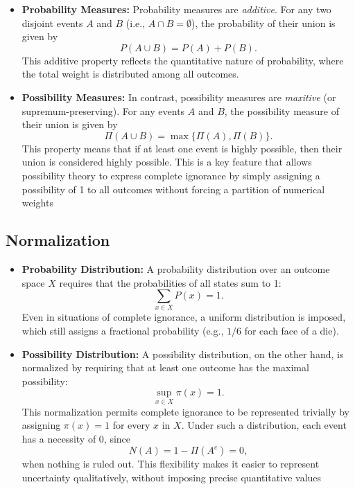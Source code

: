 \documentclass[14pt,a4paper]{report}
\begin{document}
\begin{itemize}
  \item \textbf{Probability Measures:}  
  Probability measures are \emph{additive}. For any two disjoint events \(A\) and \(B\) (i.e., \(A\cap B=\emptyset\)), the probability of their union is given by
  \[
  P(A \cup B) = P(A) + P(B).
  \]
  This additive property reflects the quantitative nature of probability, where the total weight is distributed among all outcomes.

  \item \textbf{Possibility Measures:}  
  In contrast, possibility measures are \emph{maxitive} (or supremum-preserving). For any events \(A\) and \(B\), the possibility measure of their union is given by
  \[
  \Pi(A \cup B) = \max\{\Pi(A), \Pi(B)\}.
  \]
  This property means that if at least one event is highly possible, then their union is considered highly possible. This is a key feature that allows possibility theory to express complete ignorance by simply assigning a possibility of 1 to all outcomes without forcing a partition of numerical weights 
\end{itemize}

\subsection{Normalization}

\begin{itemize}
  \item \textbf{Probability Distribution:}  
  A probability distribution over an outcome space \(X\) requires that the probabilities of all states sum to 1:
  \[
  \sum_{x \in X} P(x) = 1.
  \]
  Even in situations of complete ignorance, a uniform distribution is imposed, which still assigns a fractional probability (e.g., \(1/6\) for each face of a die).

  \item \textbf{Possibility Distribution:}  
  A possibility distribution, on the other hand, is normalized by requiring that at least one outcome has the maximal possibility:
  \[
  \sup_{x \in X} \pi(x) = 1.
  \]
  This normalization permits complete ignorance to be represented trivially by assigning \( \pi(x)=1 \) for every \(x\) in \(X\). Under such a distribution, each event has a necessity of 0, since
  \[
  N(A) = 1 - \Pi(A^c) = 0,
  \]
  when nothing is ruled out. This flexibility makes it easier to represent uncertainty qualitatively, without imposing precise quantitative values 
\end{itemize}
\end{document}

